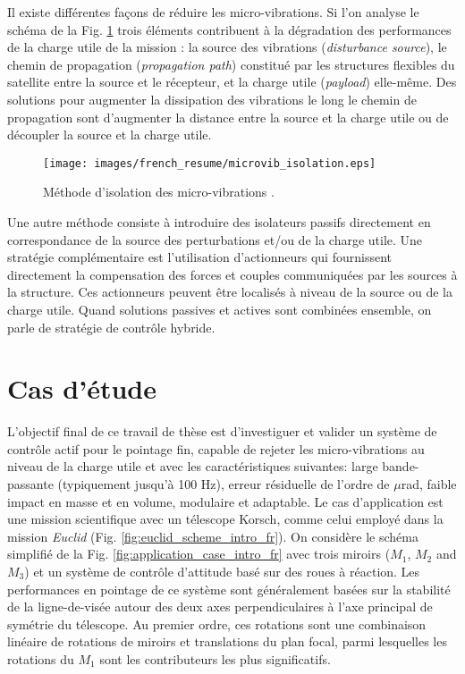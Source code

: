 Il existe diff\'erentes façons de r\'eduire les micro-vibrations. Si l'on analyse le sch\'ema de la Fig. \ref{fig:microvib_isolation_fr} trois \'el\'ements contribuent \`a la d\'egradation des performances de la charge utile de la mission : la source des vibrations (\textit{disturbance source}), le chemin de propagation (\textit{propagation path}) constitu\'e par les structures flexibles du satellite entre la source et le r\'ecepteur, et la charge utile (\textit{payload}) elle-même. Des solutions pour augmenter la dissipation des vibrations le long le chemin de propagation sont  d'augmenter la distance entre la source et la charge utile ou de d\'ecoupler la source et la charge utile.

\begin{figure}[!th]
	\centering
	\texttt{[image: images/french\_resume/microvib\_isolation.eps]}
	\caption{M\'ethode d'isolation des micro-vibrations \cite{CRS13}.}
	\label{fig:microvib_isolation_fr}
\end{figure}

Une autre m\'ethode consiste à introduire des isolateurs passifs directement en correspondance de la source des perturbations et/ou de la charge utile. Une strat\'egie compl\'ementaire est l'utilisation d'actionneurs qui fournissent directement la compensation des forces et couples communiqu\'ees par les sources \`a la structure. Ces actionneurs peuvent être localis\'es \`a niveau de la source ou de la charge utile. Quand solutions passives et actives sont combin\'ees ensemble, on parle de strat\'egie de contr\^ole hybride. 

\section{Cas d'\'etude}

L'objectif final de ce travail de th\`ese est d'investiguer et valider un syst\`eme de contr\^ole actif pour le pointage fin, capable de rejeter les micro-vibrations au niveau de la charge utile et avec les caractéristiques suivantes: large bande-passante (typiquement jusqu'\`a 100 Hz), erreur r\'esiduelle de l'ordre de $\mu$rad, faible impact en masse et en volume, modulaire et adaptable. 
Le cas d'application est une mission scientifique avec un t\'elescope Korsch, comme celui employ\'e dans la mission \textit{Euclid} (Fig. \ref{fig:euclid_scheme_intro_fr}). On consid\`ere le sch\'ema simplifi\'e de la Fig. \ref{fig:application_case_intro_fr} avec trois miroirs ($M_1$, $M_2$ and $M_3$) et un syst\`eme de contr\^ole d'attitude bas\'e sur des roues \`a r\'eaction. Les performances en pointage de ce syst\`eme sont g\'en\'eralement bas\'ees sur la stabilit\'e de la ligne-de-vis\'ee autour des deux axes perpendiculaires \`a l'axe principal de sym\'etrie du t\'elescope.  Au premier ordre, ces rotations sont une combinaison lin\'eaire de rotations de miroirs et translations du plan focal, parmi lesquelles les rotations du $M_1$ sont les contributeurs les plus significatifs. 

